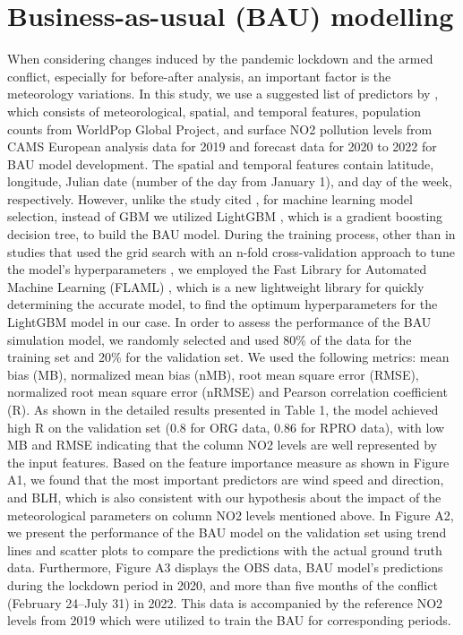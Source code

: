 \section{Business-as-usual (BAU) modelling} \label{chap3_bau}
When considering changes induced by the pandemic lockdown and the armed conflict, especially for before-after analysis, an important factor is the meteorology variations. In this study, we use a suggested list of predictors by \citep{barre2021estimating}, which consists of meteorological, spatial, and temporal features, population counts from WorldPop Global Project, and surface NO2 pollution levels from CAMS European analysis data for 2019 and forecast data for 2020 to 2022 for BAU model development. The spatial and temporal features contain latitude, longitude, Julian date (number of the day from January 1), and day of the week, respectively. However, unlike the study cited \citep{barre2021estimating}, for machine learning model selection, instead of GBM we utilized LightGBM \citep{ke2017lightgbm}, which is a gradient boosting decision tree, to build the BAU model. During the training process, other than in studies that used the grid search with an n-fold cross-validation approach to tune the model’s hyperparameters \citep{barre2021estimating,petetin2020meteorology}, we employed the Fast Library for Automated Machine Learning (FLAML) \citep{wang2021flaml}, which is a new lightweight library for quickly determining the accurate model, to find the optimum hyperparameters for the LightGBM model in our case. In order to assess the performance of the BAU simulation model, we randomly selected and used 80\% of the data for the training set and 20\% for the validation set. We used the following metrics: mean bias (MB), normalized mean bias (nMB), root mean square error (RMSE), normalized root mean square error (nRMSE) and Pearson correlation coefficient (R). As shown in the detailed results presented in Table 1, the model achieved high R on the validation set (0.8 for ORG data, 0.86 for RPRO data), with low MB and RMSE indicating that the column NO2 levels are well represented by the input features. Based on the feature importance measure as shown in Figure A1, we found that the most important predictors are wind speed and direction, and BLH, which is also consistent with our hypothesis about the impact of the meteorological parameters on column NO2 levels mentioned above. In Figure A2, we present the performance of the BAU model on the validation set using trend lines and scatter plots to compare the predictions with the actual ground truth data. Furthermore, Figure A3 displays the OBS data, BAU model’s predictions during the lockdown period in 2020, and more than five months of the conflict (February 24–July 31) in 2022. This data is accompanied by the reference NO2 levels from 2019 which were utilized to train the BAU for corresponding periods. \par
